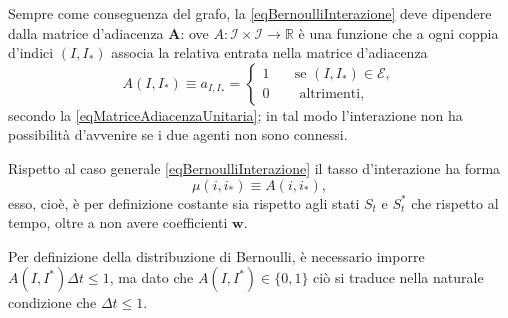                 Sempre come conseguenza del grafo, la \ref{eqBernoulliInterazione} deve dipendere dalla matrice d'adiacenza \(\mathbf A\):
                ove \(A\colon\mathcal I\times\mathcal I\to\mathbb R\) è una funzione che a ogni coppia d'indici \((I,I_*)\) associa la relativa entrata nella matrice d'adiacenza
                \begin{equation*}
                    \newcommand\hspz{\hspace{1em}}
                    A(I,I_*)\equiv a_{I,I_*}=
                    \left\{\begin{aligned}
                        1&\hspz\text{se }(I,I_*)\in\mathcal E,\\
                        0&\hspz\text{ altrimenti},%
                    \end{aligned}\right.
                \end{equation*}
                secondo la \cref{eqMatriceAdiacenzaUnitaria}; in tal modo l'interazione non ha possibilità d'avvenire se i due agenti non sono connessi.

                \begin{oss}
                    \label{ossConfrontoBernoulliClassicoUrbano}
                    Rispetto al caso generale \ref{eqBernoulliInterazione} il tasso d'interazione ha forma
                    \begin{equation}
                        \label{eqTassoInterazioneUrbano}
                        \mu(i,i_*)\equiv A(i,i_*),
                    \end{equation}
                    esso, cioè, è per definizione costante sia rispetto agli stati \(S_t\) e \(S^*_t\) che rispetto al tempo, oltre a non avere coefficienti\footnotemark{} \(\mathbf w\).%
                \end{oss}

                \begin{oss}
                    Per definizione della distribuzione di Bernoulli, è necessario imporre \(A(I,I^*)\Delta t\leq1\), ma dato che \(A(I,I^*)\in\{0,1\}\) ciò si traduce nella naturale condizione che \(\Delta t\leq1\).
                \end{oss}

